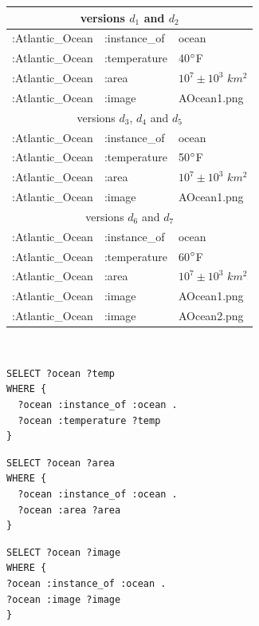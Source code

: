 \documentclass[runningheads]{llncs}
\begin{document}
\setlength{\tabcolsep}{6pt}
\begin{tabular}{l l l}    \hline	
	\multicolumn{3}{c}{versions $d_1$ and $d_2$} \\    \hline
	:Atlantic\_Ocean  & :instance\_of  & ocean          \\
	:Atlantic\_Ocean  & :temperature   & 40$\degree$F          \\
	:Atlantic\_Ocean  & :area          & $10^7\pm10^3$ $km^2$ \\
	:Atlantic\_Ocean  & :image         & AOcean1.png    \\    \hline
	\multicolumn{3}{c}{versions $d_3$, $d_4$ and $d_5$} \\    \hline
	:Atlantic\_Ocean  & :instance\_of  & ocean          \\
	:Atlantic\_Ocean  & :temperature   & 50$\degree$F             \\
	:Atlantic\_Ocean  & :area          & $10^7\pm10^3$ $km^2$ \\
	:Atlantic\_Ocean  & :image         & AOcean1.png    \\    \hline
	\multicolumn{3}{c}{versions $d_6$ and $d_7$} \\    \hline
	:Atlantic\_Ocean  & :instance\_of  & ocean          \\
	:Atlantic\_Ocean  & :temperature   & 60$\degree$F    \\
	:Atlantic\_Ocean  & :area          & $10^7\pm10^3$ $km^2$ \\
	:Atlantic\_Ocean  & :image         & AOcean1.png    \\
	:Atlantic\_Ocean  & :image         & AOcean2.png    \\    \hline
\end{tabular}\\

\begin{lstlisting}[captionpos=b, caption=SPARQL query about ocean temperatures., label=lst:sparql0,
basicstyle=\ttfamily,frame=single]
SELECT ?ocean ?temp
WHERE {
  ?ocean :instance_of :ocean .
  ?ocean :temperature ?temp
}
\end{lstlisting}

\begin{lstlisting}[captionpos=b, caption=SPARQL query about ocean areas., label=lst:sparql1,
basicstyle=\ttfamily,frame=single]
SELECT ?ocean ?area
WHERE {
  ?ocean :instance_of :ocean .
  ?ocean :area ?area
}
\end{lstlisting}

\begin{lstlisting}[captionpos=b, caption=SPARQL query about ocean images., label=lst:sparql2,
basicstyle=\ttfamily,frame=single]
SELECT ?ocean ?image
WHERE {
?ocean :instance_of :ocean .
?ocean :image ?image
}
\end{lstlisting}
\end{document}
